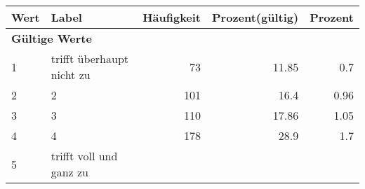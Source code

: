      \begin{longtable}{lXrrr}
     \toprule
     \textbf{Wert} & \textbf{Label} & \textbf{Häufigkeit} & \textbf{Prozent(gültig)} & \textbf{Prozent} \\
     \endhead
     \midrule
     \multicolumn{5}{l}{\textbf{Gültige Werte}}\\

     1 &
     \multicolumn{1}{X}{ trifft überhaupt nicht zu   } &


       \num{73} &
       \num[round-mode=places,round-precision=2]{11,85} &
         \num[round-mode=places,round-precision=2]{0,7} \\

     2 &
     \multicolumn{1}{X}{ 2   } &


       \num{101} &
       \num[round-mode=places,round-precision=2]{16,4} &
         \num[round-mode=places,round-precision=2]{0,96} \\

     3 &
     \multicolumn{1}{X}{ 3   } &


       \num{110} &
       \num[round-mode=places,round-precision=2]{17,86} &
         \num[round-mode=places,round-precision=2]{1,05} \\

     4 &
     \multicolumn{1}{X}{ 4   } &


       \num{178} &
       \num[round-mode=places,round-precision=2]{28,9} &
         \num[round-mode=places,round-precision=2]{1,7} \\

     5 &
     \multicolumn{1}{X}{ trifft voll und ganz zu   } &



\end{longtable}
